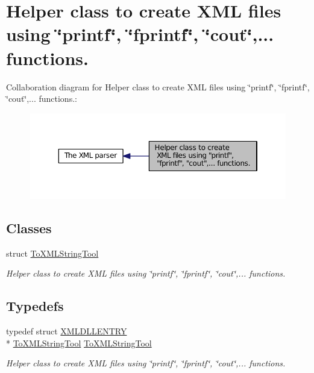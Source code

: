 \hypertarget{group__ToXMLStringTool}{\section{Helper class to create X\-M\-L files using \char`\"{}printf\char`\"{}, \char`\"{}fprintf\char`\"{}, \char`\"{}cout\char`\"{},... functions.}
\label{group__ToXMLStringTool}
}
Collaboration diagram for Helper class to create X\-M\-L files using \char`\"{}printf\char`\"{}, \char`\"{}fprintf\char`\"{}, \char`\"{}cout\char`\"{},... functions.\-:
\nopagebreak
\begin{figure}[H]
\begin{center}
\leavevmode
\includegraphics[width=350pt]{group__ToXMLStringTool}
\end{center}
\end{figure}
\subsection*{Classes}
\begin{DoxyCompactItemize}
\item 
struct \hyperlink{structToXMLStringTool}{To\-X\-M\-L\-String\-Tool}
\begin{DoxyCompactList}\small\item\em Helper class to create X\-M\-L files using \char`\"{}printf\char`\"{}, \char`\"{}fprintf\char`\"{}, \char`\"{}cout\char`\"{},... functions. \end{DoxyCompactList}\end{DoxyCompactItemize}
\subsection*{Typedefs}
\begin{DoxyCompactItemize}
\item 
typedef struct \hyperlink{xmlParser_8h_a990c86ec1cdbf675604a1a321d852063}{X\-M\-L\-D\-L\-L\-E\-N\-T\-R\-Y} \\*
\hyperlink{structToXMLStringTool}{To\-X\-M\-L\-String\-Tool} \hyperlink{group__ToXMLStringTool_ga0460d731addf12b0863d4fd857ca8281}{To\-X\-M\-L\-String\-Tool}
\begin{DoxyCompactList}\small\item\em Helper class to create X\-M\-L files using \char`\"{}printf\char`\"{}, \char`\"{}fprintf\char`\"{}, \char`\"{}cout\char`\"{},... functions. \end{DoxyCompactList}\end{DoxyCompactItemize}


